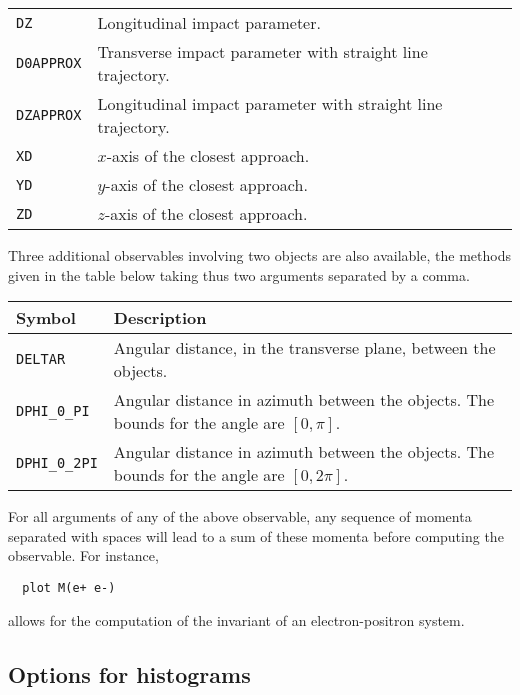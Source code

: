 \documentclass[a4paper]{article}
\begin{document}
\begin{center}
\begin{tabular}{l p{10.2cm}}
\color{ao} \verb?DZ?      & Longitudinal impact parameter.\\
\color{ao} \verb?D0APPROX?      & Transverse impact parameter with straight line trajectory.\\
\color{ao} \verb?DZAPPROX?      & Longitudinal impact parameter with straight line trajectory.\\
\color{ao} \verb?XD?      & $ x $-axis of the closest approach.\\
\color{ao} \verb?YD?      & $ y $-axis of the closest approach.\\
\color{ao} \verb?ZD?      & $ z $-axis of the closest approach.\\
\hline
\end{tabular}
\end{center}
\noindent Three additional observables involving two objects are also available, the
methods given in the table below taking thus two arguments separated by a comma.
\renewcommand{\arraystretch}{1.2}%
\begin{center}\begin{tabular}{l p{10.0cm}}
\hline
Symbol& Description\\
\hline
\color{ao} \verb?DELTAR?     & Angular distance, in the transverse plane, between the
  objects.\\
\color{ao} \verb?DPHI_0_PI?  & Angular distance in azimuth between the objects. The
  bounds for the angle are $[0,\pi]$.\\
\color{ao} \verb?DPHI_0_2PI? & Angular distance in azimuth between the objects. The
  bounds for the angle are $[0,2\pi]$.\\
\hline
\end{tabular}
\end{center}
\noindent For all arguments of any of the above observable, any sequence of momenta
separated with spaces will lead to a sum of these momenta before computing the
observable. For instance,
{\color{ao} \begin{verbatim}
  plot M(e+ e-)
\end{verbatim}}
\noindent allows for the computation of the invariant of an electron-positron system.
\newpage
\begin{shaded}
\section{\Large Options for histograms}
\end{shaded}
\end{document}
